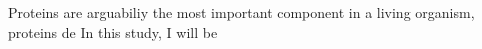Proteins are arguabiliy the most important component in a living organism, proteins de   In this study, I will be 